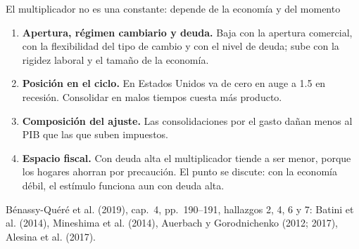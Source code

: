 \documentclass[aspectratio=169,11pt]{beamer}
\newcommand{\fuente}[1]{\par\vfill{\small\color{cGris}#1\par}}
\newcommand{\BQ}{Bénassy-Quéré et al. (2019), cap.~4}
\begin{document}
\begin{frame}{El multiplicador no es una constante: depende de la economía y del momento}
  \begin{enumerate}
    \item<1-> \textbf{Apertura, régimen cambiario y deuda.} Baja con la apertura comercial, con la flexibilidad del tipo de cambio y con el nivel de deuda; sube con la rigidez laboral y el tamaño de la economía.
    \item<2-> \textbf{Posición en el ciclo.} En Estados Unidos va de cero en auge a 1.5 en recesión. Consolidar en malos tiempos cuesta más producto.
    \item<3-> \textbf{Composición del ajuste.} Las consolidaciones por el gasto dañan menos al PIB que las que suben impuestos.
    \item<4-> \textbf{Espacio fiscal.} Con deuda alta el multiplicador tiende a ser menor, porque los hogares ahorran por precaución. El punto se discute: con la economía débil, el estímulo funciona aun con deuda alta.
  \end{enumerate}
  \fuente{\BQ, pp.~190--191, hallazgos 2, 4, 6 y 7: Batini et al. (2014), Mineshima et al. (2014), Auerbach y Gorodnichenko (2012; 2017), Alesina et al. (2017).}
\end{frame}
\end{document}
